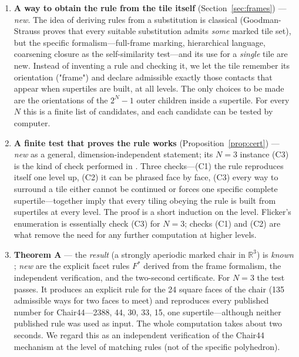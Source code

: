 \documentclass[11pt,a4paper]{article}
\theoremstyle{plain}
\theoremstyle{definition}
\begin{document}
\begin{enumerate}
\item \textbf{A way to obtain the rule from the tile itself} (Section~\ref{sec:frames}) --- \emph{new}. The idea of deriving rules from a substitution is classical (Goodman-Strauss \cite{gs98} proves that every suitable substitution admits \emph{some} marked tile set), but the specific formalism---full-frame marking, hierarchical language, coarsening closure as the self-similarity test---and its use for a \emph{single} tile are new. Instead of inventing a rule and checking it, we let the tile remember its orientation ("frame") and declare admissible exactly those contacts that appear when supertiles are built, at all levels. The only choices to be made are the orientations of the $2^N - 1$ outer children inside a supertile. For every $N$ this is a finite list of candidates, and each candidate can be tested by computer.

\item \textbf{A finite test that proves the rule works} (Proposition~\ref{prop:cert}) --- \emph{new} as a general, dimension-independent statement; its $N = 3$ instance (C3) is the kind of check performed in \cite{flicker}. Three checks---(C1) the rule reproduces itself one level up, (C2) it can be phrased face by face, (C3) every way to surround a tile either cannot be continued or forces one specific complete supertile---together imply that every tiling obeying the rule is built from supertiles at every level. The proof is a short induction on the level. Flicker's enumeration \cite{flicker} is essentially check (C3) for $N = 3$; checks (C1) and (C2) are what remove the need for any further computation at higher levels.

\item \textbf{Theorem A} --- the \emph{result} (a strongly aperiodic marked chair in $\mathbb{R}^3$) is \emph{known} \cite{tsiokos,gs2026,flicker}; \emph{new} are the explicit facet rules $F^*$ derived from the frame formalism, the independent verification, and the two-second certificate. For $N = 3$ the test passes. It produces an explicit rule for the 24 square faces of the chair (135 admissible ways for two faces to meet) and reproduces every published number for Chair44---2388, 44, 30, 33, 15, one supertile---although neither published rule was used as input. The whole computation takes about two seconds. We regard this as an independent verification of the Chair44 mechanism at the level of matching rules (not of the specific polyhedron).


\end{enumerate}
\end{document}

